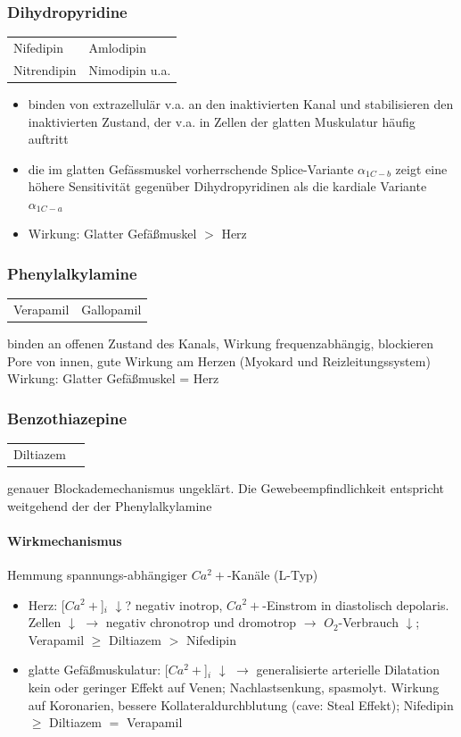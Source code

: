 \documentclass[10pt,a4paper]{report}
\begin{document}
\subsubsection{Dihydropyridine}

\begin{tabularx}{\textwidth}{XX}
Nifedipin&Amlodipin\\ 
Nitrendipin&Nimodipin  u.a.\\
\end{tabularx}

\begin{itemize}
	\item binden von extrazellulär v.a. an den inaktivierten Kanal und stabilisieren den inaktivierten Zustand, der v.a. in Zellen der glatten Muskulatur häufig auftritt
	\item die im glatten Gefässmuskel vorherrschende Splice-Variante $\alpha_{1C-b}$ zeigt eine höhere Sensitivität gegenüber Dihydropyridinen als die kardiale Variante $\alpha_{1C-a}$
	\item Wirkung: Glatter Gefäßmuskel $>$ Herz
\end{itemize}

\subsubsection{Phenylalkylamine}
\begin{tabularx}{\textwidth}{XX}
Verapamil&Gallopamil\\
\end{tabularx}
binden an offenen Zustand des Kanals, Wirkung frequenzabhängig, blockieren Pore von innen, gute Wirkung am Herzen (Myokard und Reizleitungssystem) Wirkung: Glatter Gefäßmuskel = Herz

\subsubsection{Benzothiazepine}
\begin{tabularx}{\textwidth}{XX}
Diltiazem&\\
\end{tabularx}
genauer Blockademechanismus ungeklärt. Die Gewebeempfindlichkeit entspricht weitgehend der der Phenylalkylamine
\paragraph{Wirkmechanismus} Hemmung spannungs-abhängiger $Ca^2+$-Kanäle (L-Typ)
\begin{itemize}
	\item Herz: 	[$Ca^2+$]$_i$ $\downarrow$? negativ inotrop, $Ca^2+$-Einstrom in diastolisch depolaris. Zellen $\downarrow$ $\rightarrow$ negativ chronotrop und dromotrop $\rightarrow$ $O_2$-Verbrauch $\downarrow$; Verapamil $\geq$ Diltiazem $>$ Nifedipin
	\item glatte Gefäßmuskulatur:  [$Ca^2+$]$_i$ $\downarrow$  $\rightarrow$ generalisierte arterielle Dilatation
	kein oder geringer Effekt auf Venen; Nachlastsenkung, spasmolyt. 
	Wirkung auf Koronarien, bessere Kollateraldurchblutung (cave: Steal 	Effekt); Nifedipin $\geq$ Diltiazem $=$ Verapamil
\end{itemize}
\end{document}
